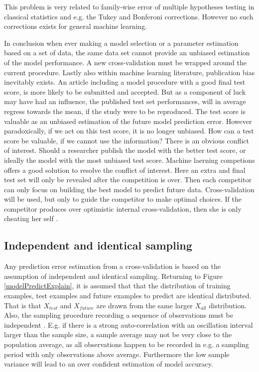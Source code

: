 This problem is very related to family-wise error of multiple hypotheses testing in classical statistics and e.g. the Tukey and Bonferoni corrections. However no such corrections exists for general machine learning.

In conclusion when ever making a model selection or a parameter estimation based on a set of data, the same data set cannot provide an unbiased estimation of the model performance. A new cross-validation must be wrapped around the current procedure. Lastly also within machine learning literature, publication bias inevitably exists. An article including a model procedure with a good final test score, is more likely to be submitted and accepted. But as a component of luck may have had an influence, the published test set performances, will in average regress towards the mean, if the study were to be reproduced. The test score is valuable as an unbiased estimation of the future model prediction error. However paradoxically, if we act on this test score, it is no longer unbiased. How can a test score be valuable, if we cannot use the information? There is an obvious conflict of interest. Should a researcher publish the model with the better test score, or ideally the model with the most unbiased test score. Machine laerning competions offers a good solution to resolve the conflict of interest. Here an extra and final test set will only be revealed after the competition is over. Then each competitor can only focus on building the best model to predict future data. Cross-validation will be used, but only to guide the competitor to make optimal choices. If the competitor produces over optimistic internal cross-validation, then she is only cheating her self \cite{seroussi2015steps}.

\subsection{Independent and identical sampling}
\label{iid}
Any prediction error estimation from a cross-validation is based on the assumption of independent and identical sampling. Returning to Figure \ref{modelPredictExplain}, it is assumed that that the distribution of training examples, test examples and future examples to predict are identical distributed. That is that $X_{test}$ and $X_{future}$ are drawn from the same larger $X_{all}$ distribution. Also, the sampling procedure recording a sequence of observations must be independent \cite{le2010performance}. E.g. if there is a strong auto-correlation with an oscillation interval larger than the sample size, a sample average may not be very close to the population average, as all observations happen to be recorded in e.g. a sampling period with only observations above average. Furthermore the low sample variance will lead to an over confident estimation of model accuracy.

